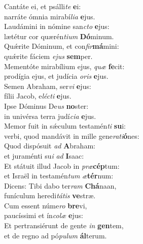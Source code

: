\evenverse Cantáte ei, et psálli\textit{te} \textbf{e}i:~\*\\
\evenverse narráte ómnia mirabí\textit{li}\textit{a} \textbf{e}jus.\\
\oddverse Laudámini in nómine san\textit{cto} \textbf{e}jus:~\*\\
\oddverse lætétur cor quærén\textit{ti}\textit{um} \textbf{Dó}minum.\\
\evenverse Quǽrite Dóminum, et con\textit{fir}\textbf{má}mini:~\*\\
\evenverse quǽrite fáciem \textit{e}\textit{jus} \textbf{sem}per.\\
\oddverse Mementóte mirabílium ejus, \textit{quæ} \textbf{fe}cit:~\*\\
\oddverse prodígia ejus, et judícia \textit{o}\textit{ris} \textbf{e}jus.\\
\evenverse Semen Abraham, ser\textit{vi} \textbf{e}jus:~\*\\
\evenverse fílii Jacob, e\textit{lé}\textit{cti} \textbf{e}jus.\\
\oddverse Ipse Dóminus De\textit{us} \textbf{no}ster:~\*\\
\oddverse in univérsa terra judí\textit{ci}\textit{a} \textbf{e}jus.\\
\evenverse Memor fuit in sǽculum testamén\textit{ti} \textbf{su}i:~\*\\
\evenverse verbi, quod mandávit in mille gene\textit{ra}\textit{ti}\textbf{ó}nes:\\
\oddverse Quod dispósuit \textit{ad} \textbf{A}braham:~\*\\
\oddverse et juraménti su\textit{i} \textit{ad} \textbf{I}saac:\\
\evenverse Et státuit illud Jacob in \textit{præ}\textbf{cép}tum:~\*\\
\evenverse et Israël in testamén\textit{tum} \textit{æ}\textbf{tér}num:\\
\oddverse Dicens: Tibi dabo ter\textit{ram} \textbf{Chá}naan,~\*\\
\oddverse funículum heredi\textit{tá}\textit{tis} \textbf{ve}stræ.\\
\evenverse Cum essent núme\textit{ro} \textbf{bre}vi,~\*\\
\evenverse paucíssimi et ín\textit{co}\textit{læ} \textbf{e}jus:\\
\oddverse Et pertransiérunt de gente \textit{in} \textbf{gen}tem,~\*\\
\oddverse et de regno ad pó\textit{pu}\textit{lum} \textbf{ál}terum.\\
